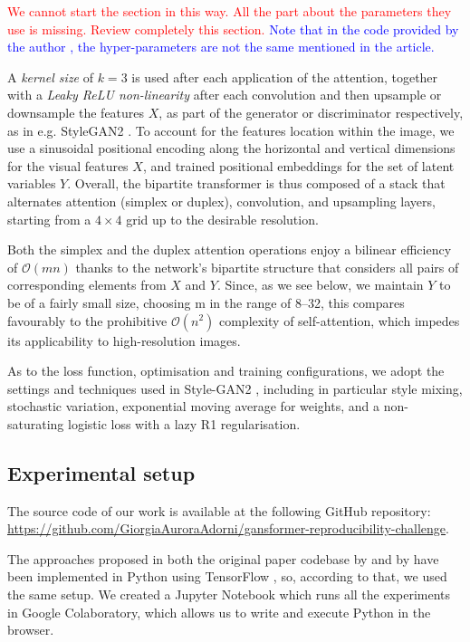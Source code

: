 \documentclass{article}
\begin{document}
	\textcolor{red}{We cannot start the section in this way. All the part about the parameters they use is 
	missing. Review completely this section.}
	\textcolor{blue}{Note that in the code provided by the author \cite{hudson2021generative}, the 
	hyper-parameters are not the same mentioned in the article. }
	
	A \textit{kernel size} of $k = 3$ is used after each application of the attention, together with a 
	\textit{Leaky ReLU non-linearity} after each convolution and then upsample or downsample the 
	features $X$, as part of the generator or discriminator respectively, as in e.g. StyleGAN2 
	\cite{karras2020analyzing}. 
	To account for the features location within the image, we use a sinusoidal positional encoding along 
	the horizontal and vertical dimensions for the visual features $X$, and trained positional 
	embeddings for the set of latent variables $Y$.
	Overall, the bipartite transformer is thus composed of a stack that alternates attention (simplex or 
	duplex), convolution, and upsampling layers, starting from a $4 \times 4$ grid up to the desirable 
	resolution. 
	
	Both the simplex and the duplex attention operations enjoy a bilinear efficiency of 
	$\mathcal{O}(mn)$ thanks to the network’s bipartite structure that considers all pairs of 
	corresponding elements from $X$ and $Y$. Since, as we see below, we maintain $Y$ to be of a fairly 
	small size, choosing m in the range of 8–32, this compares favourably to the prohibitive 	
	$\mathcal{O}(n^2)$  complexity of self-attention, which impedes its applicability to high-resolution 
	images.
	
	As to the loss function, optimisation and training configurations, we adopt the settings and 
	techniques used in Style-GAN2 \cite{karras2020analyzing}, including in particular style mixing, 
	stochastic variation, exponential moving average for weights, and a non-saturating logistic loss with 
	a lazy R1 regularisation.
	
	\subsection{Experimental setup}	
	The source code of our work is available at the following GitHub repository: 
	\url{https://github.com/GiorgiaAuroraAdorni/gansformer-reproducibility-challenge}.
	 
	 The approaches proposed in both the original paper codebase by \citet{karras2020analyzing} and 
	 by \citet{hudson2021generative} have been implemented in Python using TensorFlow 
	 \cite{tensorflow2015-whitepaper}, so, according to that, we used the same setup.
	 We created a Jupyter Notebook which runs all the experiments in Google Colaboratory, which 
	 allows us to write and execute Python in the browser. 
	 
\end{document}

